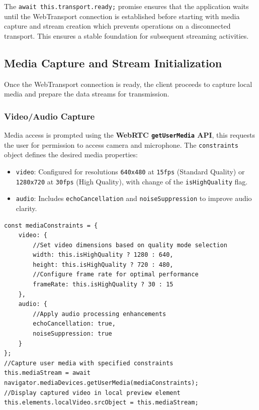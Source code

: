 The \texttt{await this.transport.ready;} promise ensures that the application waits until the WebTransport connection is established before starting with media capture and stream creation which prevents operations on a disconnected transport. This ensures a stable foundation for subsequent streaming activities.

\subsection{Media Capture and Stream Initialization}
Once the WebTransport connection is ready, the client proceeds to capture local media and prepare the data streams for transmission.

\subsubsection{Video/Audio Capture}
Media access is prompted using the \textbf{WebRTC \texttt{getUserMedia} API}, this requests the user for permission to access camera and microphone. The \texttt{constraints} object defines the desired media properties:

\begin{itemize}
    \item \texttt{video}: Configured for resolutions \texttt{640x480} at \texttt{15fps} (Standard Quality) or \texttt{1280x720} at \texttt{30fps} (High Quality), with change of the \texttt{isHighQuality} flag.
    \item \texttt{audio}: Includes \texttt{echoCancellation} and \texttt{noiseSuppression} to improve audio clarity.
\end{itemize}

\begin{lstlisting}[breaklines=true,basicstyle=\small\ttfamily,frame=single]
const mediaConstraints = {
    video: {
        //Set video dimensions based on quality mode selection
        width: this.isHighQuality ? 1280 : 640,
        height: this.isHighQuality ? 720 : 480,
        //Configure frame rate for optimal performance
        frameRate: this.isHighQuality ? 30 : 15
    },
    audio: {
        //Apply audio processing enhancements
        echoCancellation: true,
        noiseSuppression: true
    }
};
//Capture user media with specified constraints
this.mediaStream = await navigator.mediaDevices.getUserMedia(mediaConstraints);
//Display captured video in local preview element
this.elements.localVideo.srcObject = this.mediaStream;
\end{lstlisting}

